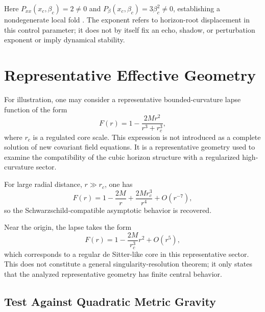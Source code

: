 \documentclass[11pt,a4paper]{article}
\begin{document}
Here \(P_{xx}(x_c,\beta_c)=2\ne0\) and
\(P_\beta(x_c,\beta_c)=3\beta_c^2\ne0\), establishing a nondegenerate local
fold \cite{arnold1992,chasnov2020}. The exponent refers to horizon-root
displacement in this control parameter; it does not by itself fix an echo,
shadow, or perturbation exponent or imply dynamical stability.

\section{Representative Effective Geometry}

For illustration, one may consider a representative bounded-curvature lapse
function of the form
\begin{equation}
F(r)=1-\frac{2M r^2}{r^3+r_c^3},
\label{eq:effective_lapse}
\end{equation}
where \(r_c\) is a regulated core scale. This expression is not introduced as a
complete solution of new covariant field equations. It is a representative
geometry used to examine the compatibility of the cubic horizon structure with a
regularized high-curvature sector.

For large radial distance, \(r\gg r_c\), one has
\begin{equation}
F(r)=1-\frac{2M}{r}+\frac{2M r_c^3}{r^4}+O(r^{-7}),
\end{equation}
so the Schwarzschild-compatible asymptotic behavior is recovered.

Near the origin, the lapse takes the form
\begin{equation}
F(r)=1-\frac{2M}{r_c^3}r^2+O(r^5),
\end{equation}
which corresponds to a regular de Sitter-like core in this representative
sector. This does not constitute a general singularity-resolution theorem; it
only states that the analyzed representative geometry has finite central
behavior.


\subsection{Test Against Quadratic Metric Gravity}
\end{document}
